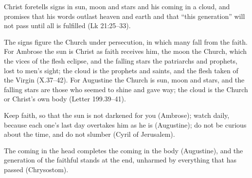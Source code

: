 \begin{fourSenses}
\item[Literal.] Christ foretells signs in sun, moon and stars and his coming
in a cloud, and promises that his words outlast heaven and earth and that
``this generation'' will not pass until all is fulfilled (Lk 21:25--33).
\item[Allegorical.] The signs figure the Church under persecution, in which
many fall from the faith. For Ambrose the sun is Christ as faith receives him,
the moon the Church, which the vices of the flesh eclipse, and the falling
stars the patriarchs and prophets, lost to men's sight; the cloud is the
prophets and saints, and the flesh taken of the Virgin (X.37--42). For
Augustine the Church is sun, moon and stars, and the falling stars are those
who seemed to shine and gave way; the cloud is the Church or Christ's own body
(Letter 199.39--41).
\item[Moral.] Keep faith, so that the sun is not darkened for you
(Ambrose); watch daily, because each one's last day overtakes him as he is
(Augustine); do not be curious about the time, and do not slumber (Cyril of
Jerusalem).
\item[Anagogical.] The coming in the head completes the coming in the body
(Augustine), and the generation of the faithful stands at the end, unharmed
by everything that has passed (Chrysostom).
\end{fourSenses}
